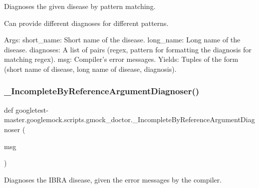 \begin{DoxyVerb}Diagnoses the given disease by pattern matching.

Can provide different diagnoses for different patterns.

Args:
  short_name: Short name of the disease.
  long_name:  Long name of the disease.
  diagnoses:  A list of pairs (regex, pattern for formatting the diagnosis
              for matching regex).
  msg:        Compiler's error messages.
Yields:
  Tuples of the form
    (short name of disease, long name of disease, diagnosis).
\end{DoxyVerb}
 \mbox{\label{namespacegoogletest-master_1_1googlemock_1_1scripts_1_1gmock__doctor_a2c4c9e38261c39f3110b9d1510c24dde}} 
\subsubsection{\texorpdfstring{\_IncompleteByReferenceArgumentDiagnoser()}{\_IncompleteByReferenceArgumentDiagnoser()}}
{\footnotesize\ttfamily def googletest-\/master.\+googlemock.\+scripts.\+gmock\+\_\+doctor.\+\_\+\+Incomplete\+By\+Reference\+Argument\+Diagnoser (\begin{DoxyParamCaption}\item[{}]{msg }\end{DoxyParamCaption})\hspace{0.3cm}{\ttfamily [private]}}

\begin{DoxyVerb}Diagnoses the IBRA disease, given the error messages by the compiler.\end{DoxyVerb}
 \mbox{\label{namespacegoogletest-master_1_1googlemock_1_1scripts_1_1gmock__doctor_a471a02832014a22835f67a46042ed705}} 
